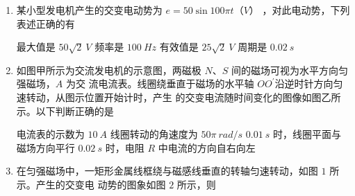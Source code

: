 



\begin{enumerate}
\item
{}
某小型发电机产生的交变电动势为 $ e=50 \sin 100 \pi t $（$ V $）
，对此电动势，下列表述正确的有  

\fourchoices
{最大值是 $ 50\sqrt{2} \ V $}
{频率是 $ 100 \ Hz $}
{有效值是 $ 25\sqrt{2} \ V $}
{周期是 $ 0.02 \ s $}


\item 
{}
如图甲所示为交流发电机的示意图，两磁极 $ N $、$ S $ 间的磁场可视为水平方向匀强磁场，$ A $ 为交
流电流表。线圈绕垂直于磁场的水平轴 $ OO ^{\prime} $沿逆时针方向匀速转动，从图示位置开始计时，产生
的交变电流随时间变化的图像如图乙所
示。以下判断正确的是  
\begin{figure}[h!]
\centering
\begin{subfigure}{0.4\linewidth}
\centering
 
\caption{}\label{}
\end{subfigure}
\begin{subfigure}{0.4\linewidth}
\centering
 
\caption{}\label{}
\end{subfigure}
\end{figure}




\fourchoices
{电流表的示数为 $ 10 \ A $}
{线圈转动的角速度为 $ 50 \pi \ rad/s $}
{$ 0.01 \ s $ 时，线圈平面与磁场方向平行}
{$ 0.02 \ s $ 时，电阻 $ R $ 中电流的方向自右向左}



\item 
{}
在匀强磁场中，一矩形金属线框绕与磁感线垂直的转轴匀速转动，如图 $ 1 $ 所示。产生的交变电
动势的图象如图 $ 2 $ 所示，则  
\begin{figure}[h!]
\centering
\begin{subfigure}{0.4\linewidth}
\centering
 
\caption{}\label{}
\end{subfigure}
\begin{subfigure}{0.4\linewidth}
\centering
 
\caption{}\label{}
\end{subfigure}
\end{figure}


\end{enumerate}
